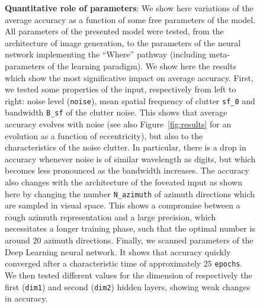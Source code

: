 \begin{figure}[t!]%
\caption{
{\bf Quantitative role of parameters}: We show here variations of the average accuracy as a function of some free parameters of the model. All parameters of the presented model were tested, from the architecture of image generation, to the parameters of the neural network implementing the ``Where'' pathway (including meta-parameters of the learning paradigm). We show here the results which show the most significative impact on average accuracy. %
\A First, we tested some properties of the input, respectively from left to right: noise level (\texttt{noise}), mean spatial frequency of clutter \texttt{sf\_0} and bandwidth \texttt{B\_sf} of the clutter noise. This shows that average accuracy evolves with noise (see also Figure~\ref{fig:results} for an evolution as a function of eccentricity), but also to the characteristics of the noise clutter. In particular, there is a drop in accuracy whenever noise is of similar wavelength as digits, but which becomes less pronounced as the bandwidth increases. %
\B The accuracy also changes with the architecture of the foveated input as shown here by changing the number \texttt{N\_azimuth} of azimuth directions which are sampled in visual space. This shows a compromise between a rough azimuth representation and a large precision, which necessitates a longer training phase, such that the optimal number is around $20$ azimuth directions. %
\C Finally, we scanned parameters of the Deep Learning neural network. It shows that accuracy quickly converged after a characteristic time of approximately $25$ \texttt{epochs}. We then tested different values for the dimension of respectively the first (\texttt{dim1}) and second (\texttt{dim2}) hidden layers, showing weak changes in accuracy. %
\label{fig:params}}%
\end{figure}%

